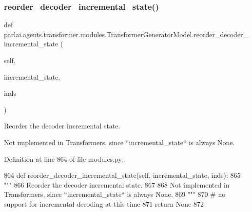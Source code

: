 \subsubsection{\texorpdfstring{reorder\+\_\+decoder\+\_\+incremental\+\_\+state()}{reorder\_decoder\_incremental\_state()}}
{\footnotesize\ttfamily def parlai.\+agents.\+transformer.\+modules.\+Transformer\+Generator\+Model.\+reorder\+\_\+decoder\+\_\+incremental\+\_\+state (\begin{DoxyParamCaption}\item[{}]{self,  }\item[{}]{incremental\+\_\+state,  }\item[{}]{inds }\end{DoxyParamCaption})}

\begin{DoxyVerb}Reorder the decoder incremental state.

Not implemented in Transformers, since ``incremental_state`` is always None.
\end{DoxyVerb}
 

Definition at line 864 of file modules.\+py.


\begin{DoxyCode}
864     \textcolor{keyword}{def }reorder\_decoder\_incremental\_state(self, incremental\_state, inds):
865         \textcolor{stringliteral}{"""}
866 \textcolor{stringliteral}{        Reorder the decoder incremental state.}
867 \textcolor{stringliteral}{}
868 \textcolor{stringliteral}{        Not implemented in Transformers, since ``incremental\_state`` is always None.}
869 \textcolor{stringliteral}{        """}
870         \textcolor{comment}{# no support for incremental decoding at this time}
871         \textcolor{keywordflow}{return} \textcolor{keywordtype}{None}
872 
\end{DoxyCode}
\mbox{\label{classparlai_1_1agents_1_1transformer_1_1modules_1_1TransformerGeneratorModel_a9b9261bca59f10692c15cbaaa3ffce65}} 
